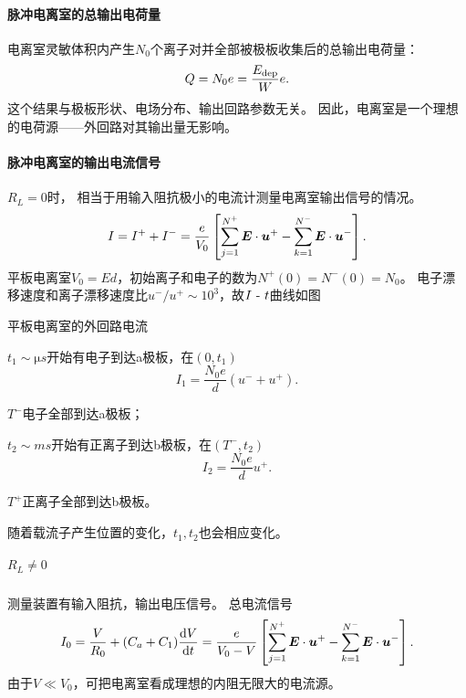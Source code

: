 \paragraph{脉冲电离室的总输出电荷量}
电离室灵敏体积内产生$N_0$个离子对并全部被极板收集后的总输出电荷量：
\[
	Q=N_0e=\frac{E_{\mathrm{dep}}}We.
\]
这个结果与极板形状、电场分布、输出回路参数无关。
因此，电离室是一个理想的电荷源——外回路对其输出量无影响。
\paragraph{脉冲电离室的输出电流信号}$R_L=0$时，
相当于用输入阻抗极小的电流计测量电离室输出信号的情况。%
\[
	I=I^++I^-=\frac e{V_0}\left[\sum_{j=1}^{N^+}\bm E\cdot\bm u^+-\sum_{k=1}^{N^-}\bm E\cdot\bm u^-\right].
\]
平板电离室$V_0=Ed$，初始离子和电子的数为$N^+(0)=N^-(0)=N_0$。
电子漂移速度和离子漂移速度比$u^-/u^+\sim 10^3$，故$I~\text{-}~ t$曲线如图
\begin{center}
	\tikzchap 平板电离室的外回路电流
\end{center}
\begin{compactenum}
	\item $t_1\sim\si{\micro s}$开始有电子到达a极板，在$(0,t_1)$
	\[
		I_1=\frac{N_0e}d(u^-+u^+).
	\]
	\item $T^-$电子全部到达a极板；
	\item $t_2\sim\si{ms}$开始有正离子到达b极板，在$(T^-,t_2)$
	\[
		I_2=\frac{N_0e}du^+.
	\]
	\item $T^+$正离子全部到达b极板。
\end{compactenum}
随着载流子产生位置的变化，$t_1,t_2$也会相应变化。
\subparagraph{$R_L\neq 0$}
测量装置有输入阻抗，输出电压信号。
总电流信号
\[
	I_0=\frac V{R_0}+(C_a+C_1)\frac{\mathrm{d}^{\;\!\!}V}{\mathrm{d} t^{\;\!\!}}=\frac e{V_0-V}\left[\sum_{j=1}^{N^+}\bm E\cdot\bm u^+-\sum_{k=1}^{N^-}\bm E\cdot\bm u^-\right].
\]
由于$V\ll V_0$，可把电离室看成理想的内阻无限大的电流源。

